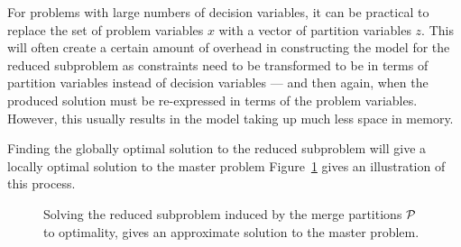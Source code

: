\documentclass[journal]{IEEEtran}
\begin{document}
For problems with large numbers of decision variables, it can be practical to replace the set of problem variables $x$ with a vector of partition variables $z$. This will often create a certain amount of overhead in constructing the model for the reduced subproblem as constraints need to be transformed to be in terms of partition variables instead of decision variables --- and then again, when the produced solution must be re-expressed in terms of the problem variables. However, this usually results in the model taking up much less space in memory.

Finding the globally optimal solution to the reduced subproblem will give a locally optimal solution to the master problem Figure~\ref{fig:merge-solve} gives an illustration of this process.

\begin{figure}[h]
  \centering
  \quad 
  \quad%
  \quad
  \caption[Solving the reduced subproblem gives an approximate solution to the master problem]{Solving the reduced subproblem induced by the merge partitions ${\cal P}$ to optimality, gives an approximate solution to the master problem.} 
    \label{fig:merge-solve}
\end{figure}
\end{document}
